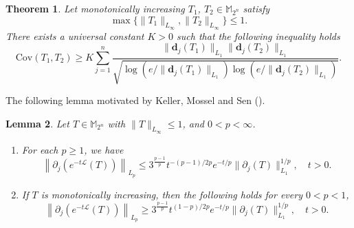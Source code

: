 \documentclass{amsbook}
\newtheorem{theorem}{Theorem}[chapter]
\newtheorem{lemma}[theorem]{Lemma}
\theoremstyle{definition}
\theoremstyle{remark}
\numberwithin{section}{chapter}
\numberwithin{equation}{chapter}
\newcommand{\M}{\mathbb{M}}
\newcommand{\1}{\mathbf{1}}
\newcommand{\La}{\mathcal{L}}
\newcommand{\dc}{\mathbf{d}}
\begin{document}
\begin{theorem}\label{quantum-kms}
Let monotonically increasing $T_1$, $T_2\in \M_{2^{n}}$ satisfy  
$$\max\{\|T_1\|_{L_{\infty}},\|T_2\|_{L_{\infty}}\}\leq 1.$$	There exists a universal constant $K>0$ such that the following inequality holds 
	\begin{equation}\label{correlation}
		\mathrm{Cov}(T_1,T_2)\geq K\sum_{j=1}^{n}\frac{\|\dc_{j}(T_1)\|_{L_{1}}\|\dc_{j}(T_2)\|_{L_{1}}}{\sqrt{\log(e/\|\dc_{j}(T_1)\|_{L_{1}})\log(e/\|\dc_{j}(T_2)\|_{L_{1}})}}.
	\end{equation}
\end{theorem}



The following lemma motivated by Keller, Mossel and Sen (\cite{KMS2014}).  
\begin{lemma}\label{technical-1}
Let $T\in \M_{2^{n}}$ with $\|T\|_{L_{\infty}}\leq 1$, and $0<p<\infty$. 
	\begin{enumerate}[{\rm(i)}]
		\item For each $p\geq 1$, we have 
		\[
		\left\|\partial_{j}\left(e^{-t\La}(T)\right)\right\|_{L_{p}}\leq 3^{\frac{p-1}{p}} t^{-(p-1)/2p}e^{-t/p}\|\partial_{j}(T)\|^{1/p}_{L_{1}},\quad t>0.
		\]
		\item If $T$ is monotonically increasing, then the following holds for every $0<p<1$,
		\[
		\left\|\partial_{j}\left(e^{-t\La}(T)\right)\right\|_{L_{p}}\geq 3^{\frac{p-1}{p}} t^{(1-p)/2p}e^{-t/p}\|\partial_{j}(T)\|^{1/p}_{L_{1}},\quad t>0.
		\]
	\end{enumerate}
\end{lemma}
\end{document}
